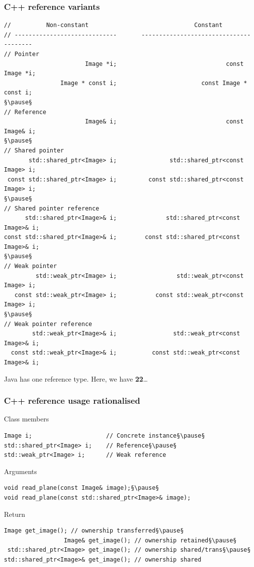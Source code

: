 \documentclass{beamer}
\begin{document}
\begin{frame}[fragile]
  \frametitle{C++ reference variants}
  \begin{lstlisting}[basicstyle=\tiny\ttfamily]
//          Non-constant                              Constant
// -----------------------------       ---------------------------------------
// Pointer
                       Image *i;                               const Image *i;
                Image * const i;                        const Image * const i;
§\pause§
// Reference
                       Image& i;                               const Image& i;
§\pause§
// Shared pointer
       std::shared_ptr<Image> i;               std::shared_ptr<const Image> i;
 const std::shared_ptr<Image> i;         const std::shared_ptr<const Image> i;
§\pause§
// Shared pointer reference
      std::shared_ptr<Image>& i;              std::shared_ptr<const Image>& i;
const std::shared_ptr<Image>& i;        const std::shared_ptr<const Image>& i;
§\pause§
// Weak pointer
         std::weak_ptr<Image> i;                 std::weak_ptr<const Image> i;
   const std::weak_ptr<Image> i;           const std::weak_ptr<const Image> i;
§\pause§
// Weak pointer reference
        std::weak_ptr<Image>& i;                std::weak_ptr<const Image>& i;
  const std::weak_ptr<Image>& i;          const std::weak_ptr<const Image>& i;
\end{lstlisting}
\pause
\begin{center}
  Java has one reference type.  Here, we have \textbf{22}…
\end{center}
\end{frame}

\begin{frame}[fragile]
  \frametitle{C++ reference usage rationalised}
\begin{block}{Class members}
  \begin{lstlisting}[basicstyle=\scriptsize\ttfamily]
Image i;                     // Concrete instance§\pause§
std::shared_ptr<Image> i;    // Reference§\pause§
std::weak_ptr<Image> i;      // Weak reference
\end{lstlisting}
\pause
\end{block}
\begin{block}{Arguments}
  \begin{lstlisting}[basicstyle=\scriptsize\ttfamily]
void read_plane(const Image& image);§\pause§
void read_plane(const std::shared_ptr<Image>& image);
\end{lstlisting}
\pause
\end{block}
\begin{block}{Return}
  \begin{lstlisting}[basicstyle=\scriptsize\ttfamily]
                  Image get_image(); // ownership transferred§\pause§
                 Image& get_image(); // ownership retained§\pause§
 std::shared_ptr<Image> get_image(); // ownership shared/trans§\pause§
std::shared_ptr<Image>& get_image(); // ownership shared
\end{lstlisting}
\end{block}
\end{frame}
\end{document}
